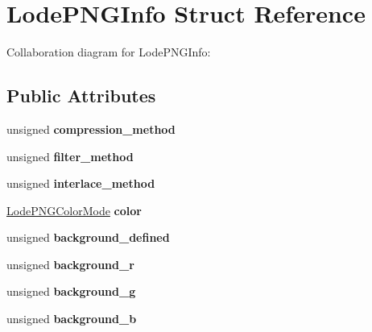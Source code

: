 \hypertarget{struct_lode_p_n_g_info}{\section{Lode\+P\+N\+G\+Info Struct Reference}
\label{struct_lode_p_n_g_info}
}


Collaboration diagram for Lode\+P\+N\+G\+Info\+:
\subsection*{Public Attributes}
\begin{DoxyCompactItemize}
\item 
\hypertarget{struct_lode_p_n_g_info_a42bcacd0dbaaea01c04cc87b58ac3c1d}{unsigned {\bfseries compression\+\_\+method}}\label{struct_lode_p_n_g_info_a42bcacd0dbaaea01c04cc87b58ac3c1d}

\item 
\hypertarget{struct_lode_p_n_g_info_a5098d6e8aa528d5197f51914439633b9}{unsigned {\bfseries filter\+\_\+method}}\label{struct_lode_p_n_g_info_a5098d6e8aa528d5197f51914439633b9}

\item 
\hypertarget{struct_lode_p_n_g_info_a80207e3e53c959b2285636496a3dd3f1}{unsigned {\bfseries interlace\+\_\+method}}\label{struct_lode_p_n_g_info_a80207e3e53c959b2285636496a3dd3f1}

\item 
\hypertarget{struct_lode_p_n_g_info_a0af9bab3435084780ce8c1cb69bb2628}{\hyperlink{struct_lode_p_n_g_color_mode}{Lode\+P\+N\+G\+Color\+Mode} {\bfseries color}}\label{struct_lode_p_n_g_info_a0af9bab3435084780ce8c1cb69bb2628}

\item 
\hypertarget{struct_lode_p_n_g_info_aa94c65344af02472adb9c71eae2e765f}{unsigned {\bfseries background\+\_\+defined}}\label{struct_lode_p_n_g_info_aa94c65344af02472adb9c71eae2e765f}

\item 
\hypertarget{struct_lode_p_n_g_info_a98b59c3760bda184bb16c9713b430bc3}{unsigned {\bfseries background\+\_\+r}}\label{struct_lode_p_n_g_info_a98b59c3760bda184bb16c9713b430bc3}

\item 
\hypertarget{struct_lode_p_n_g_info_abf638e191edaeaa2b02c371a381e3a89}{unsigned {\bfseries background\+\_\+g}}\label{struct_lode_p_n_g_info_abf638e191edaeaa2b02c371a381e3a89}

\item 
\hypertarget{struct_lode_p_n_g_info_a994de0c74ef1092f056ff534e00dfa0d}{unsigned {\bfseries background\+\_\+b}}\label{struct_lode_p_n_g_info_a994de0c74ef1092f056ff534e00dfa0d}


\end{DoxyCompactItemize}
